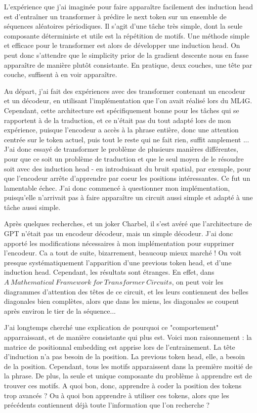 \documentclass{article}
\begin{document}
L'expérience que j'ai imaginée pour faire apparaître facilement des induction head est d'entraîner un transformer à prédire le next token sur un ensemble de séquences aléatoires périodiques.
Il s'agit d'une tâche très simple, dont la seule composante déterministe et utile est la répétition de motifs. Une méthode simple et efficace pour le transformer est alors de développer une induction head. On peut donc s'attendre que le simplicity prior de la gradient descente nous en fasse apparaître de manière plutôt consistante. En pratique, deux couches, une tête par couche, suffisent à en voir apparaître.\newline

Au départ, j'ai fait des expériences avec des transformer contenant un encodeur et un décodeur, en utilisant l'implémentation que l'on avait réalisé lors du ML4G. Cependant, cette architecture est spécifiquement bonne pour les tâches qui se rapportent à de la traduction, et ce n'était pas du tout adapté lors de mon expérience, puisque l'encodeur a accès à la phrase entière, donc une attention centrée sur le token actuel, puis tout le reste qui ne fait rien, suffit amplement ... J'ai donc essayé de transformer le problème de plusieurs manières différentes, pour que ce soit un problème de traduction et que le seul moyen de le résoudre soit avec des induction head - en introduisant du bruit spatial, par exemple, pour que l'encodeur arrête d'apprendre par coeur les positions intéressantes. Ce fut un lamentable échec.
J'ai donc commencé à questionner mon implémentation, puisqu'elle n'arrivait pas à faire apparaître un circuit aussi simple et adapté à une tâche aussi simple.

Après quelques recherches, et un joker Charbel, il s'est avéré que l'architecture de GPT n'était pas un encodeur décodeur, mais un simple décodeur. J'ai donc apporté les modifications nécessaires à mon implémentation pour supprimer l'encodeur. Ca a tout de suite, bizarrement, beaucoup mieux marché ! On voit presque systématiquement l'apparition d'une previous token head, et d'une induction head. Cependant, les résultats sont étranges. En effet, dans $A\ Mathematical\ Framework\ for\ Transformer\ Circuits$, on peut voir les diagrammes d'attention des têtes de ce circuit, et les leurs contiennent des belles diagonales bien complètes, alors que dans les miens, les diagonales se coupent après environ le tier de la séquence...

J'ai longtemps cherché une explication de pourquoi ce "comportement" apparraissant, et de manière consistante qui plus est. Voici mon raisonnement : la matrice de positionnal embedding est apprise lors de l'entrainement. La tête d'induction n'a pas besoin de la position. La previous token head, elle, a besoin de la position. Cependant, tous les motifs apparaissent dans la première moitié de la phrase. De plus, la seule et unique composante du problème à apprendre est de trouver ces motifs. A quoi bon, donc, apprendre à coder la position des tokens trop avancés ? Ou à quoi bon apprendre à utiliser ces tokens, alors que les précédents contiennent déjà toute l'information que l'on recherche ?
\end{document}
